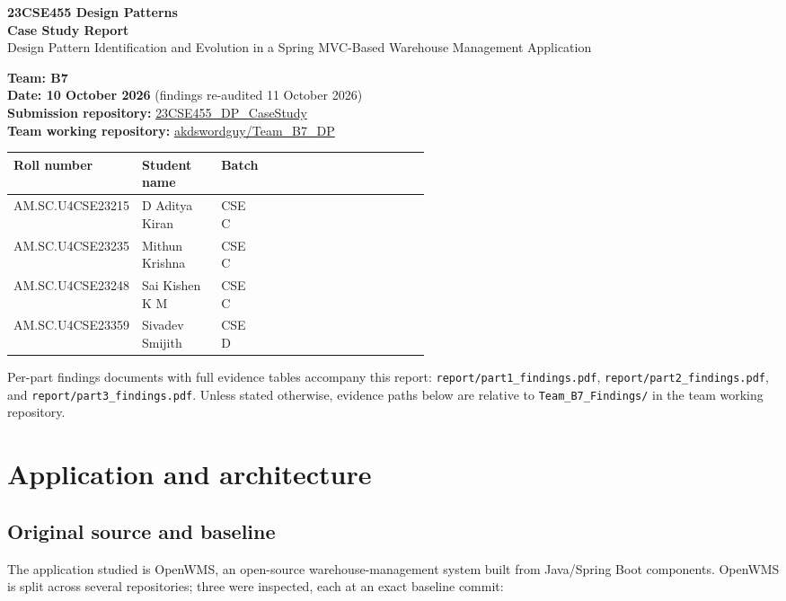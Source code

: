 \documentclass[11pt,a4paper]{article}
\title{}
\author{}
\date{}
\newcommand{\code}[1]{\nolinkurl{#1}}
\begin{document}
\begin{center}
{\Large\textbf{23CSE455 Design Patterns}}\\[4pt]
{\LARGE\textbf{Case Study Report}}\\[6pt]
{\large Design Pattern Identification and Evolution in a Spring MVC-Based Warehouse Management Application}
\end{center}

\textbf{Team: B7}\\
\textbf{Date: 10 October 2026} (findings re-audited 11 October 2026)\\
\textbf{Submission repository:} \href{https://github.com/aswathymohan-amrita/23CSE455_DP_CaseStudy}{23CSE455\_DP\_CaseStudy}\\
\textbf{Team working repository:} \href{https://github.com/akdswordguy/Team_B7_DP}{akdswordguy/Team\_B7\_DP}


\begin{tabularx}{\linewidth}{@{}P{0.25\linewidth}P{0.19\linewidth}P{0.10\linewidth}X@{}}
\toprule
Roll number & Student name & Batch \\
\midrule
AM.SC.U4CSE23215 & D Aditya Kiran & CSE C \\
AM.SC.U4CSE23235 & Mithun Krishna & CSE C \\
AM.SC.U4CSE23248 & Sai Kishen K M & CSE C\\
AM.SC.U4CSE23359 & Sivadev Smijith & CSE D \\
\bottomrule
\end{tabularx}

Per-part findings documents with full evidence tables accompany this report: \code{report/part1_findings.pdf}, \code{report/part2_findings.pdf}, and \code{report/part3_findings.pdf}. Unless stated otherwise, evidence paths below are relative to \code{Team_B7_Findings/} in the team working repository.

\section{Application and architecture}

\subsection{Original source and baseline}
The application studied is OpenWMS, an open-source warehouse-management system built from Java/Spring Boot components. OpenWMS is split across several repositories; three were inspected, each at an exact baseline commit:
\end{document}
